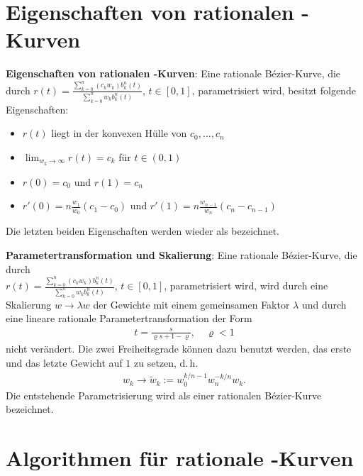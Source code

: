 \section{%
    Eigenschaften von rationalen -Kurven%
}

\textbf{Eigenschaften von rationalen -Kurven}:
Eine rationale Bézier-Kurve, die durch
$r(t) = \frac{\sum_{k=0}^n (c_k w_k) b_k^n(t)}{\sum_{k=0}^n w_k b_k^n(t)}$, $t \in [0, 1]$,
parametrisiert wird, besitzt folgende Eigenschaften:
\begin{itemize}
    \item
    $r(t)$ liegt in der konvexen Hülle von $c_0, \dotsc, c_n$

    \item
    $\lim_{w_k \to \infty} r(t) = c_k$ für $t \in (0, 1)$

    \item
    $r(0) = c_0$ und $r(1) = c_n$

    \item
    $r'(0) = n \frac{w_1}{w_0} (c_1 - c_0)$ und $r'(1) = n \frac{w_{n-1}}{w_n} (c_n - c_{n-1})$
\end{itemize}
Die letzten beiden Eigenschaften werden wieder als  bezeichnet.

\linie
\pagebreak

\textbf{Parametertransformation und Skalierung}:
Eine rationale Bézier-Kurve, die durch\\
$r(t) = \frac{\sum_{k=0}^n (c_k w_k) b_k^n(t)}{\sum_{k=0}^n w_k b_k^n(t)}$, $t \in [0, 1]$,
parametrisiert wird, wird durch eine Skalierung $w \rightarrow \lambda w$
der Gewichte mit einem gemeinsamen Faktor $\lambda$ und durch eine lineare rationale
Parametertransformation der Form
\begin{align*}
    t = \frac{s}{\varrho s + 1 - \varrho},\quad \varrho < 1
\end{align*}
nicht verändert.
Die zwei Freiheitsgrade können dazu benutzt werden, das erste und das letzte Gewicht auf $1$
zu setzen, d.\,h.
\begin{align*}
    w_k \rightarrow \widetilde{w}_k := w_0^{k/n-1} w_n^{-k/n} w_k.
\end{align*}
Die entstehende Parametrisierung wird als  einer rationalen
Bézier-Kurve bezeichnet.

\section{%
    Algorithmen für rationale -Kurven%
}

